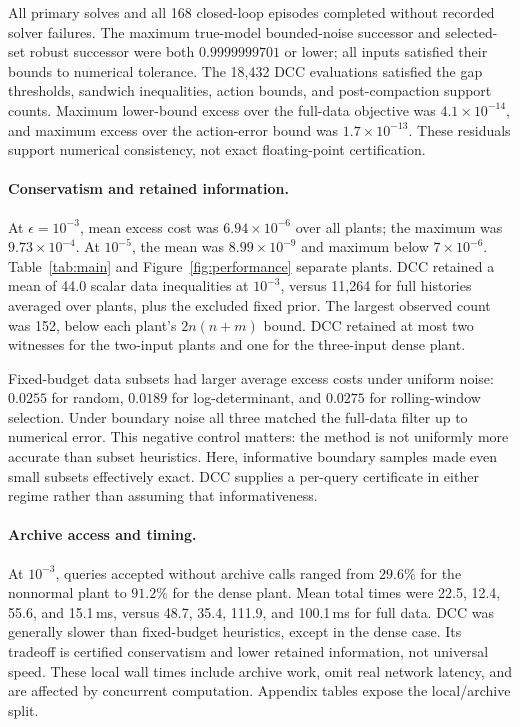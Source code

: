 All primary solves and all 168 closed-loop episodes completed without recorded solver failures. The maximum true-model bounded-noise successor and selected-set robust successor were both $0.9999999701$ or lower; all inputs satisfied their bounds to numerical tolerance. The 18,432 DCC evaluations satisfied the gap thresholds, sandwich inequalities, action bounds, and post-compaction support counts. Maximum lower-bound excess over the full-data objective was $4.1\times10^{-14}$, and maximum excess over the action-error bound was $1.7\times10^{-13}$. These residuals support numerical consistency, not exact floating-point certification.

\paragraph{Conservatism and retained information.}
At $\epsilon=10^{-3}$, mean excess cost was $6.94\times10^{-6}$ over all plants; the maximum was $9.73\times10^{-4}$. At $10^{-5}$, the mean was $8.99\times10^{-9}$ and maximum below $7\times10^{-6}$. Table~\ref{tab:main} and Figure~\ref{fig:performance} separate plants. DCC retained a mean of 44.0 scalar data inequalities at $10^{-3}$, versus 11,264 for full histories averaged over plants, plus the excluded fixed prior. The largest observed count was 152, below each plant's $2n(n+m)$ bound. DCC retained at most two witnesses for the two-input plants and one for the three-input dense plant.

Fixed-budget data subsets had larger average excess costs under uniform noise: $0.0255$ for random, $0.0189$ for log-determinant, and $0.0275$ for rolling-window selection. Under boundary noise all three matched the full-data filter up to numerical error. This negative control matters: the method is not uniformly more accurate than subset heuristics. Here, informative boundary samples made even small subsets effectively exact. DCC supplies a per-query certificate in either regime rather than assuming that informativeness.

\paragraph{Archive access and timing.}
At $10^{-3}$, queries accepted without archive calls ranged from $29.6\%$ for the nonnormal plant to $91.2\%$ for the dense plant. Mean total times were 22.5, 12.4, 55.6, and 15.1\,ms, versus 48.7, 35.4, 111.9, and 100.1\,ms for full data. DCC was generally slower than fixed-budget heuristics, except in the dense case. Its tradeoff is certified conservatism and lower retained information, not universal speed. These local wall times include archive work, omit real network latency, and are affected by concurrent computation. Appendix tables expose the local/archive split.

